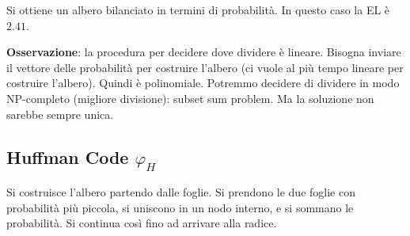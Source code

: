 \begin{center}
\end{center}
Si ottiene un albero bilanciato in termini di probabilità. In questo caso la EL è $2.41$.\medskip 

\textbf{Osservazione}: la procedura per decidere dove dividere è lineare. Bisogna inviare il vettore delle probabilità per costruire l'albero (ci vuole al più tempo lineare per costruire l'albero). Quindi è polinomiale. Potremmo decidere di dividere in modo NP-completo (migliore divisione): subset sum problem. Ma la soluzione non sarebbe sempre unica.


\subsection{Huffman Code $\varphi_H$}
Si costruisce l'albero partendo dalle foglie. Si prendono le due foglie con probabilità più piccola, si uniscono in un nodo interno, e si sommano le probabilità. Si continua così fino ad arrivare alla radice. 

